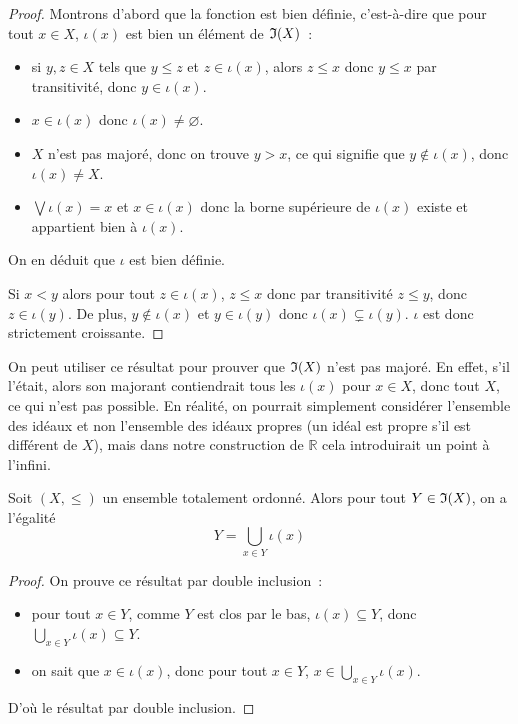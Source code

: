 \begin{proof}
  Montrons d'abord que la fonction est bien définie, c'est-à-dire que pour tout
  $x\in X$, $\iota(x)$ est bien un élément de $\mathfrak{I}(X)$~:
  \begin{itemize}
  \item si $y,z\in X$ tels que $y\leq z$ et $z\in \iota(x)$, alors $z \leq x$
    donc $y\leq x$ par transitivité, donc $y\in \iota(x)$.
  \item $x\in\iota(x)$ donc $\iota(x)\neq\varnothing$.
  \item $X$ n'est pas majoré, donc on trouve $y > x$, ce qui signifie que
    $y\notin\iota(x)$, donc $\iota(x)\neq X$.
  \item $\bigvee\iota(x) = x$ et $x\in\iota(x)$ donc la borne supérieure  de
    $\iota(x)$ existe et appartient bien à $\iota(x)$.
  \end{itemize}
  On en déduit que $\iota$ est bien définie.

  Si $x < y$ alors pour tout $z \in \iota(x)$, $z \leq x$ donc par transitivité
  $z \leq y$, donc $z \in \iota(y)$. De plus, $y\notin\iota(x)$ et
  $y\in\iota(y)$ donc $\iota(x)\subsetneq\iota(y)$. $\iota$ est donc strictement
  croissante.
\end{proof}

\begin{remark}
  On peut utiliser ce résultat pour prouver que $\mathfrak{I}(X)$ n'est pas majoré.
  En effet, s'il l'était, alors son majorant contiendrait tous les $\iota(x)$
  pour $x\in X$, donc tout $X$, ce qui n'est pas possible. En réalité, on
  pourrait simplement considérer l'ensemble des idéaux et non l'ensemble des
  idéaux propres (un idéal est propre s'il est différent de $X$), mais dans
  notre construction de $\mathbb R$ cela introduirait un point à l'infini.
\end{remark}

\begin{lemma}\label{lem.id.cup}
  Soit $(X,\leq)$ un ensemble totalement ordonné. Alors pour tout
  $Y\in\mathfrak{I}(X)$, on a l'égalité
  \[Y = \bigcup_{x\in Y} \iota(x)\]
\end{lemma}

\begin{proof}
  On prouve ce résultat par double inclusion~:
  \begin{itemize}
  \item pour tout $x\in Y$, comme $Y$ est clos par le bas,
    $\iota(x)\subseteq Y$, donc
    $\displaystyle\bigcup_{x\in Y}\iota(x)\subseteq Y$.
  \item on sait que $x\in \iota(x)$, donc pour tout $x\in Y$,
    $\displaystyle x\in \bigcup_{x\in Y} \iota(x)$.
  \end{itemize}
  D'où le résultat par double inclusion.
\end{proof}

